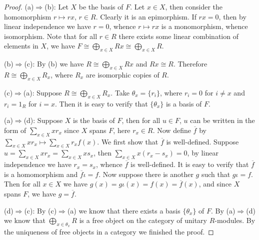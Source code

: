 \begin{proof}
(a)$\Rightarrow$(b): Let $X$ be the basis of $F$. Let $x\in X$, then consider the homomorphism $r\mapsto rx$, $r\in R$. Clearly it is an epimorphism. If $rx=0$, then by linear independence we have $r=0$, whence $r\mapsto rx$ is a monomorphism, whence isomorphism. Note that for all $r\in R$ there exists some linear combination of elements in $X$, we have $F\cong\bigoplus_{x\in X}Rx\cong\bigoplus_{x\in X}R$.\par
(b)$\Rightarrow$(c): By (b) we have $R\cong\bigoplus_{x\in X}Rx$ and $Rx\cong R$. Therefore $R\cong\bigoplus_{x\in X}R_x$, where $R_x$ are isomorphic copies of $R$.\par
(c)$\Rightarrow$(a): Suppose $R\cong\bigoplus_{x\in X}R_x$. Take $\theta_x=\{r_i\}$, where $r_i=0$ for $i\ne x$ and $r_i=1_R$ for $i=x$. Then it is easy to verify that $\{\theta_x\}$ is a basis of $F$.\par
(a)$\Rightarrow$(d): Suppose $X$ is the basis of $F$, then for all $u\in F$, $u$ can be written in the form of $\sum_{x\in X}xr_x$ since $X$ spans $F$, here $r_x\in R$. Now define $\overline{f}$ by $\sum_{x\in X}xr_x\mapsto\sum_{x\in X}r_xf(x)$. We first show that $\overline{f}$ is well-defined. Suppose $u=\sum_{x\in X}xr_x=\sum_{x\in X}xs_x$, then $\sum_{x\in X}x(r_x-s_x)=0$, by linear independence we have $r_x=s_x$, whence $\overline{f}$ is well-defined. It is easy to verify that $\overline{f}$ is a homomorphism and $\overline{f}\iota=f$. Now suppose there is another $g$ such that $g\iota=f$. Then for all $x\in X$ we have $g(x)=g\iota(x)=f(x)=\overline{f}(x)$, and since $X$ spans $F$, we have $g=\overline{f}$.\par
(d)$\Rightarrow$(c): By (c)$\Rightarrow$(a) we know that there exists a basis $\{\theta_x\}$ of $F$. By (a)$\Rightarrow$(d) we know that $\bigoplus_{x\in\theta_x}R$ is a free object on the category of unitary $R$-modules. By the uniqueness of free objects in a category we finished the proof.
\end{proof}
